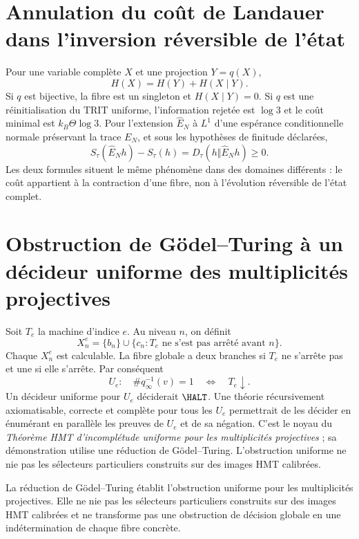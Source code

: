 \section{Annulation du coût de Landauer dans l'inversion réversible de l'état}

Pour une variable complète \(X\) et une projection \(Y=q(X)\),
\[
 H(X)=H(Y)+H(X\mid Y).
\]
Si \(q\) est bijective, la fibre est un singleton et \(H(X\mid Y)=0\). Si \(q\)
est une réinitialisation du TRIT uniforme, l'information rejetée est \(\log3\) et
le coût minimal est \(k_B\Theta\log3\). Pour l'extension
\(\widehat E_N\) à \(L^1\) d'une espérance conditionnelle normale
préservant la trace \(E_N\), et sous les hypothèses de finitude déclarées,
\[
 S_\tau(\widehat E_Nh)-S_\tau(h)
 =D_\tau(h\Vert \widehat E_Nh)\ge0.
\]
Les deux formules situent le même phénomène dans des domaines différents : le
coût appartient à la contraction d'une fibre, non à l'évolution réversible
de l'état complet.

\section{Obstruction de Gödel–Turing à un décideur uniforme des multiplicités projectives}

Soit \(T_e\) la machine d'indice \(e\). Au niveau \(n\), on définit
\[
 X_n^e=\{b_n\}\cup
 \{c_n:T_e\text{ ne s'est pas arrêté avant }n\}.
\]
Chaque \(X_n^e\) est calculable. La fibre globale a deux branches si \(T_e\) ne
s'arrête pas et une si elle s'arrête. Par conséquent
\[
 U_e:\quad \#q_\infty^{-1}(v)=1
 \quad\Longleftrightarrow\quad T_e\downarrow.
\]
Un décideur uniforme pour \(U_e\) déciderait \(\HALT\). Une théorie
récursivement axiomatisable, correcte et complète pour tous les \(U_e\)
permettrait de les décider en énumérant en parallèle les preuves de \(U_e\) et de sa
négation. C'est le noyau du \emph{Théorème HMT d'incomplétude uniforme
pour les multiplicités projectives} ; sa démonstration utilise une réduction
de Gödel--Turing. L'obstruction uniforme ne nie pas les sélecteurs particuliers
construits sur des images HMT calibrées.

\begin{controlbox}[title={Portée du contrôle d'incomplétude uniforme}]
La réduction de Gödel--Turing établit l'obstruction uniforme pour les
multiplicités projectives. Elle ne nie pas les sélecteurs particuliers construits
sur des images HMT calibrées et ne transforme pas une obstruction de décision globale
en une indétermination de chaque fibre concrète.
\end{controlbox}
